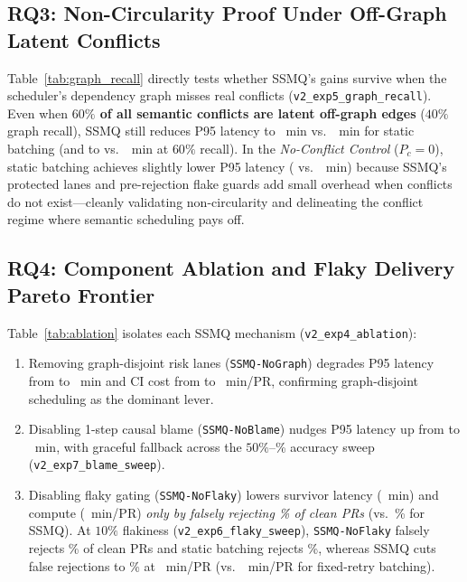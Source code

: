 

\subsection{RQ3: Non-Circularity Proof Under Off-Graph Latent Conflicts}
Table~\ref{tab:graph_recall} directly tests whether SSMQ's gains survive when the scheduler's dependency graph misses real conflicts (\texttt{v2\_exp5\_graph\_recall}). Even when \textbf{$60\%$ of all semantic conflicts are latent off-graph edges} ($40\%$ graph recall), SSMQ still reduces P95 latency to \RecallFortySSMQPNinetyFive{}~min vs.\ \RecallFortyStaticPNinetyFive{}~min for static batching (and to \RecallSixtySSMQPNinetyFive{} vs.\ \RecallSixtyStaticPNinetyFive{}~min at $60\%$ recall). In the \emph{No-Conflict Control} ($P_c=0$), static batching achieves slightly lower P95 latency (\NoConfStaticPNinetyFive{} vs.\ \NoConfSSMQPNinetyFive{}~min) because SSMQ's protected lanes and pre-rejection flake guards add small overhead when conflicts do not exist---cleanly validating non-circularity and delineating the conflict regime where semantic scheduling pays off.



\subsection{RQ4: Component Ablation and Flaky Delivery Pareto Frontier}
Table~\ref{tab:ablation} isolates each SSMQ mechanism (\texttt{v2\_exp4\_ablation}):
\begin{enumerate}
    \item Removing graph-disjoint risk lanes (\texttt{SSMQ-NoGraph}) degrades P95 latency from \SSMQPNinetyFiveLat{} to \AblNoGraphLat{}~min and CI cost from \SSMQCICost{} to \AblNoGraphCost{}~min/PR, confirming graph-disjoint scheduling as the dominant lever.
    \item Disabling 1-step causal blame (\texttt{SSMQ-NoBlame}) nudges P95 latency up from \SSMQPNinetyFiveLat{} to \AblNoBlameLat{}~min, with graceful fallback across the $50\%$--\BenchASTTopOnePct{}\% accuracy sweep (\texttt{v2\_exp7\_blame\_sweep}).
    \item Disabling flaky gating (\texttt{SSMQ-NoFlaky}) lowers survivor latency (\AblNoFlakyLat{}~min) and compute (\AblNoFlakyCost{}~min/PR) \emph{only by falsely rejecting \AblNoFlakyFRPct{}\% of clean PRs} (vs.\ \SSMQFalseRejPct{}\% for SSMQ). At $10\%$ flakiness (\texttt{v2\_exp6\_flaky\_sweep}), \texttt{SSMQ-NoFlaky} falsely rejects \FlakyTenNoFlakyFRPct{}\% of clean PRs and static batching rejects \FlakyTenStaticFRPct{}\%, whereas SSMQ cuts false rejections to \FlakyTenSSMQFRPct{}\% at \FlakyTenSSMQCost{}~min/PR (vs.\ \FlakyTenFlakeBatchCost{}~min/PR for fixed-retry batching).
\end{enumerate}


